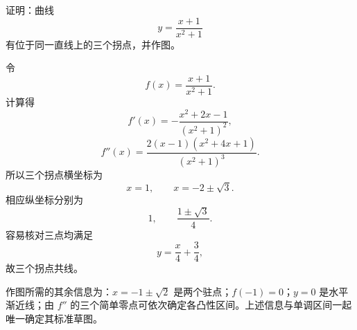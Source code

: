 \begin{xexercise}[2]
证明：曲线
  \[
    y=\frac{x+1}{x^2+1}
  \]
  有位于同一直线上的三个拐点，并作图。
\end{xexercise}
\begin{xsolution}
令
\[
  f(x)=\frac{x+1}{x^2+1}.
\]
计算得
\[
  f'(x)=-\frac{x^2+2x-1}{(x^2+1)^2},
\]
\[
  f''(x)=\frac{2(x-1)(x^2+4x+1)}{(x^2+1)^3}.
\]
所以三个拐点横坐标为
\[
  x=1,\qquad x=-2\pm\sqrt3.
\]
相应纵坐标分别为
\[
  1,\qquad \frac{1\pm\sqrt3}{4}.
\]
容易核对三点均满足
\[
  \boxed{y=\frac x4+\frac34},
\]
故三个拐点共线。

作图所需的其余信息为：$x=-1\pm\sqrt2$ 是两个驻点；$f(-1)=0$；$y=0$ 是水平渐近线；由 $f''$ 的三个简单零点可依次确定各凸性区间。上述信息与单调区间一起唯一确定其标准草图。
\end{xsolution}


